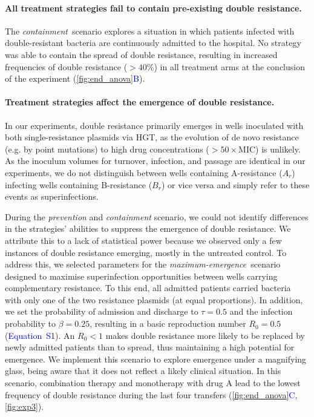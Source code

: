 \documentclass[9pt,twocolumn,twoside,lineno]{pnas-new}
\newcommand{\sieq}[1]{\textcolor{blue}{Equation~S#1}}
\newcommand{\panelref}[2]{\autoref{#1}\textcolor{blue}{#2}}
\begin{document}
    \paragraph{All treatment strategies fail to contain pre-existing double resistance.}
    The \textit{containment}~scenario explores a situation in which patients infected with double-resistant bacteria are continuously admitted to the hospital. 
    No strategy was able to contain the spread of double resistance, resulting in increased frequencies of double resistance ($> 40\%$) in all treatment arms at the conclusion of the experiment (\panelref{fig:end_anova}{B}).
    
    
    \paragraph{Treatment strategies affect the emergence of double resistance.}
    In our experiments, double resistance primarily emerges in wells inoculated with both single-resistance plasmids via HGT, as the evolution of de novo resistance (e.g. by point mutations) to high drug concentrations ($>50 \times$MIC) is unlikely.
    As the inoculum volumes for turnover, infection, and passage are identical in our experiments, we do not distinguish between wells containing A-resistance ($A_r$) infecting wells containing B-resistance ($B_r$) or vice versa and simply refer to these events as superinfections.
    
    During the \textit{prevention} and \textit{containment} scenario, we could not identify differences in the strategies' abilities to suppress the emergence of double resistance. 
    We attribute this to a lack of statistical power because we observed only a few instances of double resistance emerging, mostly in the untreated control. 
    To address this, we selected parameters for the \textit{maximum-emergence}~scenario designed to maximise superinfection opportunities between wells carrying complementary resistance. 
    To this end, all admitted patients carried bacteria with only one of the two resistance plasmids (at equal proportions). 
    In addition, we set the probability of admission and discharge to $\tau = 0.5$ and the infection probability to $\beta = 0.25$, resulting in a basic reproduction number $R_0 = 0.5$ (\sieq{1}).
    An $R_0<1$ makes double resistance more likely to be replaced by newly admitted patients than to spread, thus maintaining a high potential for emergence.
    We implement this scenario to explore emergence under a magnifying glass, being aware that it does not reflect a likely clinical situation. In this scenario, combination therapy and monotherapy with drug A lead to the lowest frequency of double resistance during the last four transfers (\panelref{fig:end_anova}{C}, \autoref{fig:exp3}).
    
\end{document}
